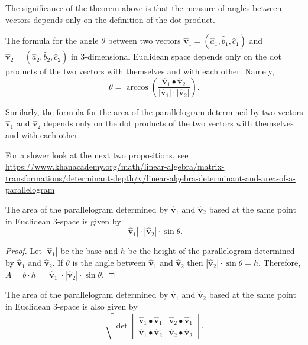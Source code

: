 \documentclass[newpage,hints,handout]{ximera}
\begin{document}
The significance of the theorem above is that the measure of angles between
vectors depends only on the definition of the dot product.

\begin{corollary}
The formula for the angle $\theta$ between two vectors $\hat{\mathbf v}_{1}=
(\hat{a}_{1},\hat{b}_{1},\hat{c}_{1})$ and $\hat{\mathbf v}_{2}=
(\hat{a}_{2},\hat{b}_{2},\hat{c}_{2})$ in $3$-dimensional Euclidean space
depends only on the dot products of the two vectors with themselves and with
each other.  Namely,%
\[
\theta=\arccos\left(\frac{\hat{\mathbf v}_{1}\bullet\hat{\mathbf v}_{2}}
                   {\lvert \hat{\mathbf v}_{1}\rvert \cdot \lvert \hat{\mathbf v}_{2}\rvert}\right).
\]
\end{corollary}

Similarly, the formula for the area of the parallelogram determined by two
vectors $\hat{\mathbf v}_{1}$ and $\hat{\mathbf v}_{2}$ depends only on the dot
products of the two vectors with themselves and with each other. 

For a slower look at the next two propositions, see \url{https://www.khanacademy.org/math/linear-algebra/matrix-transformations/determinant-depth/v/linear-algebra-determinant-and-area-of-a-parallelogram}
\begin{proposition}
The area of the parallelogram determined by $\hat{\mathbf v}_{1}$ and
$\hat{\mathbf v}_{2}$ based at the same point in Euclidean $3$-space is
given by%
\[
|\hat{\mathbf v}_{1}|\cdot|\hat{\mathbf v}_{2}|\cdot\sin\theta.
\]
\end{proposition}

\begin{proof}

Let $|\hat{\mathbf v}_{1}|$ be the base and $h$ be the height of the parallelogram determined by  $\hat{\mathbf v}_{1}$ and $\hat{\mathbf v}_{2}$.  If $\theta$ is the angle between $\hat{\mathbf v}_{1}$ and $\hat{\mathbf v}_{2}$ then $|\hat{\mathbf v}_{2}|\cdot \sin\theta = h$. Therefore, $A = b \cdot h = |\hat{\mathbf v}_{1}| \cdot |\hat{\mathbf v}_{2}| \cdot\sin\theta$.

\end{proof}

\begin{proposition}
\label{9}The area of the parallelogram determined by $\hat{\mathbf v}_{1}$
and $\hat{\mathbf v}_{2}$ based at the same point in Euclidean $3$-space is also
given by%
\[
\sqrt{\det
\begin{bmatrix}
\hat{\mathbf v}_{1}\bullet\hat{\mathbf v}_{1} & \hat{\mathbf v}_{2}\bullet\hat{\mathbf v}_{1}\\
\hat{\mathbf v}_{1}\bullet\hat{\mathbf v}_{2} & \hat{\mathbf v}_{2}\bullet\hat{\mathbf v}_{2}%
\end{bmatrix}}.
\]
\end{proposition}
\end{document}
